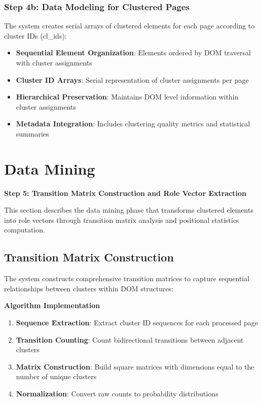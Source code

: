 \subsubsection{Step 4b: Data Modeling for Clustered Pages}
The system creates serial arrays of clustered elements for each page according to cluster IDs (cl\_ids):

\begin{itemize}
    \item \textbf{Sequential Element Organization}: Elements ordered by DOM traversal with cluster assignments
    \item \textbf{Cluster ID Arrays}: Serial representation of cluster assignments per page
    \item \textbf{Hierarchical Preservation}: Maintains DOM level information within cluster assignments
    \item \textbf{Metadata Integration}: Includes clustering quality metrics and statistical summaries
\end{itemize}

\section{Data Mining}
\label{sec:data-mining}

\textbf{Step 5: Transition Matrix Construction and Role Vector Extraction}

This section describes the data mining phase that transforms clustered elements into role vectors through transition matrix analysis and positional statistics computation.

\subsection{Transition Matrix Construction}
\label{subsec:transition-matrix}

The system constructs comprehensive transition matrices to capture sequential relationships between clusters within DOM structures:

\textbf{Algorithm Implementation}
\begin{enumerate}
    \item \textbf{Sequence Extraction}: Extract cluster ID sequences for each processed page
    \item \textbf{Transition Counting}: Count bidirectional transitions between adjacent clusters
    \item \textbf{Matrix Construction}: Build square matrices with dimensions equal to the number of unique clusters
    \item \textbf{Normalization}: Convert raw counts to probability distributions
\end{enumerate}

